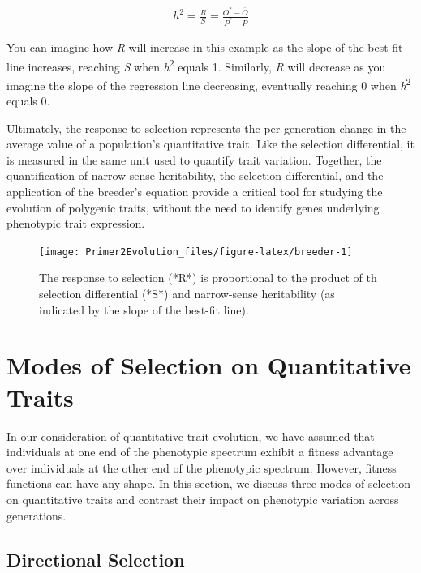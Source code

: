 \documentclass[
]{book}
\begin{document}
\begin{align} 
h^2=\frac{R}{S}=\frac{O^*-\overline{O}}{P^*-\overline{P}} \label{eq:43}
\end{align}

You can imagine how \emph{R} will increase in this example as the slope of the best-fit line increases, reaching \emph{S} when \emph{h}\textsuperscript{2} equals 1. Similarly, \emph{R} will decrease as you imagine the slope of the regression line decreasing, eventually reaching 0 when \emph{h}\textsuperscript{2} equals 0.

Ultimately, the response to selection represents the per generation change in the average value of a population's quantitative trait. Like the selection differential, it is measured in the same unit used to quantify trait variation. Together, the quantification of narrow-sense heritability, the selection differential, and the application of the breeder's equation provide a critical tool for studying the evolution of polygenic traits, without the need to identify genes underlying phenotypic trait expression.

\begin{figure}
\texttt{[image: Primer2Evolution\_files/figure-latex/breeder-1]} \caption{The response to selection (*R*) is proportional to the product of th selection differential (*S*) and narrow-sense heritability (as indicated by the slope of the best-fit line).}\label{fig:breeder}
\end{figure}

\hypertarget{modes-of-selection-on-quantitative-traits}{%
\section{Modes of Selection on Quantitative Traits}\label{modes-of-selection-on-quantitative-traits}}

In our consideration of quantitative trait evolution, we have assumed that individuals at one end of the phenotypic spectrum exhibit a fitness advantage over individuals at the other end of the phenotypic spectrum. However, fitness functions can have any shape. In this section, we discuss three modes of selection on quantitative traits and contrast their impact on phenotypic variation across generations.

\hypertarget{directional-selection}{%
\subsection{Directional Selection}\label{directional-selection}}
\end{document}
